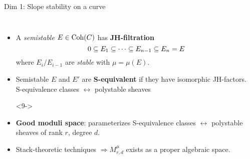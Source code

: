 \documentclass[8pt,handout]{beamer} %
\begin{document}
\begin{frame}[fragile]{Dim 1: Slope stability on a curve}
\begin{columns}[t]
    \begin{itemize}
        \item<7-> A \textit{semistable} $E \in \mathrm{Coh}(C)$ has \textbf{JH-filtration}
        \[ 0 \subseteq E_1 \subseteq \cdots \subseteq E_{n-1} \subseteq E_n = E \]
        where $E_i/E_{i-1}$ are \textit{stable} with $\mu = \mu(E)$.
        \item<8-> Semistable $E$ and $E'$ are \textbf{S-equivalent} if they have isomorphic JH-factors. \\
        S-equivalence classes $\leftrightarrow$ polystable sheaves
        \item[]<9->
        \begin{center}
        \end{center}
        \item<9-> \textbf{Good moduli space}: parameterizes S-equivalence classes $\leftrightarrow$ polystable sheaves of rank $r$, degree $d$.
        \item<10-> Stack-theoretic techniques $\Rightarrow M^\mu_{r,d}$ exists as a proper algebraic space.
    \end{itemize}
\end{columns}
\end{frame}
\end{document}
